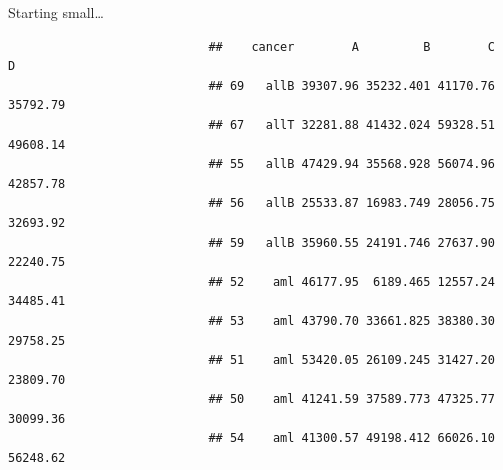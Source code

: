 \documentclass[10pt]{beamer}\usepackage[]{graphicx}\usepackage[]{color}
\begin{document}
						\begin{frame}[fragile]{Starting small\ldots{}}
							\protect\hypertarget{starting-small}{}
							
							\footnotesize
							
							\scriptsize
							
							\begin{verbatim}
							##    cancer        A         B        C        D
							## 69   allB 39307.96 35232.401 41170.76 35792.79
							## 67   allT 32281.88 41432.024 59328.51 49608.14
							## 55   allB 47429.94 35568.928 56074.96 42857.78
							## 56   allB 25533.87 16983.749 28056.75 32693.92
							## 59   allB 35960.55 24191.746 27637.90 22240.75
							## 52    aml 46177.95  6189.465 12557.24 34485.41
							## 53    aml 43790.70 33661.825 38380.30 29758.25
							## 51    aml 53420.05 26109.245 31427.20 23809.70
							## 50    aml 41241.59 37589.773 47325.77 30099.36
							## 54    aml 41300.57 49198.412 66026.10 56248.62
							\end{verbatim}
							
							\normalsize
							
						\end{frame}
						
\end{document}

